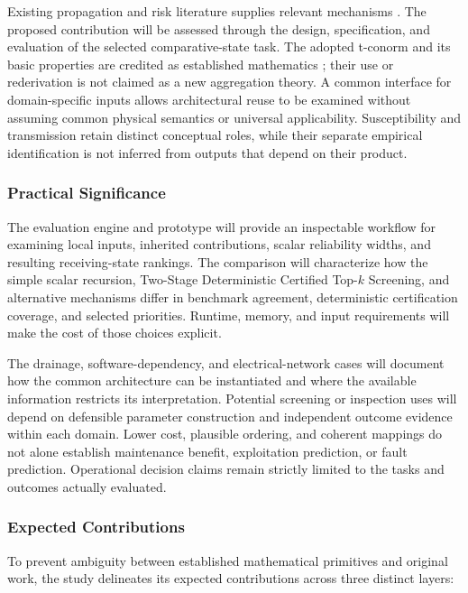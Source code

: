 Existing propagation and risk literature supplies relevant mechanisms
\citep{kempe2003,buldyrev2010,sheyner2002,munoz2017,petrone2018}. The proposed
contribution will be assessed through the design, specification, and evaluation
of the selected comparative-state task. The adopted t-conorm and its
basic properties are credited as established mathematics
\citep{klement2004}; their use or rederivation is not claimed as
a new aggregation theory. A common interface for domain-specific inputs allows
architectural reuse to be examined without assuming common physical semantics
or universal applicability. Susceptibility and transmission retain
distinct conceptual roles, while their separate empirical identification
is not inferred from outputs that depend on their product.

\subsubsection{Practical Significance}

The evaluation engine and prototype will provide an inspectable workflow for
examining local inputs, inherited contributions, scalar reliability widths,
and resulting receiving-state rankings. The comparison will characterize how
the simple scalar recursion, Two-Stage Deterministic Certified Top-$k$
Screening, and alternative mechanisms differ in benchmark agreement,
deterministic certification coverage, and selected priorities. Runtime,
memory, and input requirements will make the cost of those choices explicit.

The drainage, software-dependency, and electrical-network cases will document
how the common architecture can be instantiated and where the available
information restricts its interpretation. Potential screening or inspection
uses will depend on defensible parameter construction and independent
outcome evidence within each domain. Lower cost, plausible ordering, and
coherent mappings do not alone establish maintenance benefit, exploitation
prediction, or fault prediction. Operational decision claims remain strictly
limited to the tasks and outcomes actually evaluated.

\subsubsection{Expected Contributions}\label{expected-contributions}

To prevent ambiguity between established mathematical primitives and original
work, the study delineates its expected contributions across three distinct
layers:

